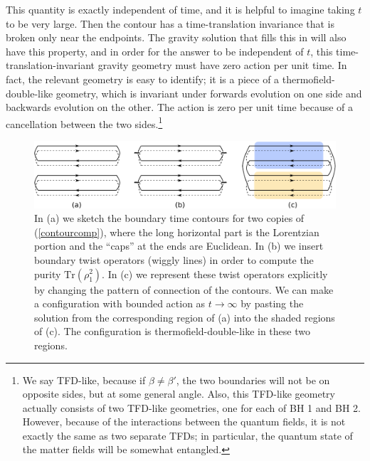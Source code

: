 \documentclass[12pt]{article}
\numberwithin{equation}{section}
\def\tr{\text{Tr}}
\begin{document}
This quantity is exactly independent of time, and it is helpful to imagine taking $t$ to be very large. Then the contour has a time-translation invariance that is broken only near the endpoints. The gravity solution that fills this in will also have this property, and in order for the answer to be independent of $t$, this time-translation-invariant gravity geometry must have zero action per unit time. In fact, the relevant geometry is easy to identify; it is a piece of a thermofield-double-like geometry, which is invariant under forwards evolution on one side and backwards evolution on the other. The action is zero per unit time because of a cancellation between the two sides.\footnote{We say TFD-like, because if $\beta\neq\beta'$, the two boundaries will not be on opposite sides, but at some general angle. Also, this TFD-like geometry actually consists of two TFD-like geometries, one for each of BH 1 and BH 2. However, because of the interactions between the quantum fields, it is not exactly the same as two separate TFDs; in particular, the quantum state of the matter fields will be somewhat entangled.}
\begin{figure}[t]
\begin{center}
\includegraphics[width = .9\textwidth]{images/contours.pdf}
\caption{{\small In (a) we sketch the boundary time contours for two copies of (\ref{contourcomp}), where the long horizontal part is the Lorentzian portion and the ``caps'' at the ends are Euclidean. In (b) we insert boundary twist operators (wiggly lines) in order to compute the purity $\tr(\rho_1^2)$. In (c) we represent these twist operators explicitly by changing the pattern of connection of the contours. We can make a configuration with bounded action as $t\to\infty$ by pasting the solution from the corresponding region of (a) into the shaded regions of (c). The configuration is thermofield-double-like in these two regions.}}\label{fig:contours}
\end{center}
\end{figure}
\end{document}
